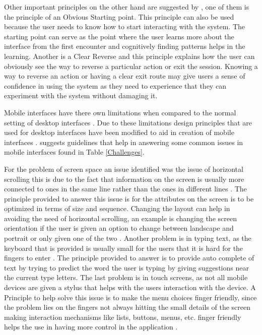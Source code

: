 Other important principles on the other hand are suggested by , one of them is the principle of an Obvious Starting point. This principle can also be used because the user needs to know how to start interacting with the system. The starting point can serve as the point where the user learns more about the interface from the first encounter and cognitively finding patterns helps in the learning. Another is a Clear Reverse and this principle explains how the user can obviously see the way to reverse a particular action or exit the session. Knowing a way to reverse an action or having a clear exit route may give users a sense of confidence in using the system as they need to experience that they can experiment with the system without damaging it.

Mobile interfaces have there own limitations when compared to the normal setting of desktop interfaces \cite{gong2004guidelines}. Due to these limitations design principles that are used for desktop interfaces have been modified to aid in creation of mobile interfaces \cite{gong2004guidelines}.  suggests guidelines that help in answering some common issues in mobile interfaces found in Table \ref{Challenges}.

For the problem of screen space an issue identified was the issue of horizontal scrolling this is due to the fact that information on the screen is usually more connected to ones in the same line rather than the ones in different lines \cite{nilsson2009design}. The principle provided to answer this issue is for the attributes on the screen is to be optimized in terms of size and sequence. Changing the layout can help in avoiding the need of horizontal scrolling, an example is changing the screen orientation if the user is given an option to change between landscape and portrait or only given one of the two \cite{nilsson2009design}. Another problem is in typing text, as the keyboard that is provided is usually small for the users that it is hard for the fingers to enter \cite{nilsson2009design}. The principle provided to answer is to provide auto complete of text by trying to predict the word the user is typing by giving suggestions near the current type letters. The last problem is in touch screens, as not all mobile devices are given a stylus that helps with the users interaction with the device. A Principle to help solve this issue is to make the menu choices finger friendly, since the problem lies on the fingers not always hitting the small details of the screen making interaction mechanisms like lists, buttons, menus, etc. finger friendly helps the use in having more control in the application \cite{nilsson2009design}.   


